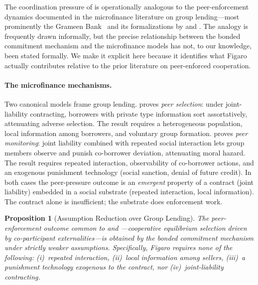 \documentclass[11pt,a4paper]{article}
\newtheorem{proposition}[theorem]{Proposition}
\theoremstyle{definition}
\theoremstyle{remark}
\begin{document}
The coordination pressure of  is
operationally analogous to the peer-enforcement dynamics documented
in the microfinance literature on group lending---most prominently
the Grameen Bank~\citep{grameen1999} and its formalizations by
\citet{ghatak1999} and \citet{stiglitz1990}. The analogy is frequently
drawn informally, but the precise relationship between the bonded
commitment mechanism and the microfinance models has not, to our
knowledge, been stated formally. We make it explicit here because
it identifies what Figaro actually contributes relative to the prior
literature on peer-enforced cooperation.

\paragraph{The microfinance mechanisms.}
Two canonical models frame group lending.
\citet{ghatak1999} proves \emph{peer selection}: under
joint-liability contracting, borrowers with private type information
sort assortatively, attenuating adverse selection. The result requires
a heterogeneous population, local information among borrowers, and
voluntary group formation.
\citet{stiglitz1990} proves \emph{peer monitoring}: joint liability
combined with repeated social interaction lets group members observe
and punish co-borrower deviation, attenuating moral hazard. The result
requires repeated interaction, observability of co-borrower actions,
and an exogenous punishment technology (social sanction, denial of
future credit). In both cases the peer-pressure outcome is an
\emph{emergent} property of a contract (joint liability) embedded in a
social substrate (repeated interaction, local information). The
contract alone is insufficient; the substrate does enforcement work.

\begin{proposition}[Assumption Reduction over Group Lending]
\label{prop:microfinance-reduction}
The peer-enforcement outcome common to \citet{ghatak1999} and
\citet{stiglitz1990}---cooperative equilibrium selection driven by
co-participant externalities---is obtained by the bonded commitment
mechanism under strictly weaker assumptions. Specifically, Figaro
requires none of the following:
(i)~repeated interaction,
(ii)~local information among sellers,
(iii)~a punishment technology exogenous to the contract, nor
(iv)~joint-liability contracting.
\end{proposition}
\end{document}
